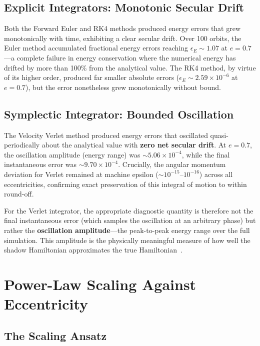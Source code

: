 \documentclass[twocolumn, 10pt]{article}
\begin{document}
\subsection{Explicit Integrators: Monotonic Secular Drift}

Both the Forward Euler and RK4 methods produced energy errors that grew monotonically with time, exhibiting a clear secular drift. Over 100 orbits, the Euler method accumulated fractional energy errors reaching $\epsilon_E \sim 1.07$ at $e = 0.7$---a complete failure in energy conservation where the numerical energy has drifted by more than 100\% from the analytical value. The RK4 method, by virtue of its higher order, produced far smaller absolute errors ($\epsilon_E \sim 2.59 \times 10^{-6}$ at $e = 0.7$), but the error nonetheless grew monotonically without bound.

\subsection{Symplectic Integrator: Bounded Oscillation}

The Velocity Verlet method produced energy errors that oscillated quasi-periodically about the analytical value with \textbf{zero net secular drift}. At $e = 0.7$, the oscillation amplitude (energy range) was $\sim 5.06 \times 10^{-4}$, while the final instantaneous error was $\sim 9.70 \times 10^{-4}$. Crucially, the angular momentum deviation for Verlet remained at machine epsilon ($\sim 10^{-15}$--$10^{-16}$) across all eccentricities, confirming exact preservation of this integral of motion to within round-off.

For the Verlet integrator, the appropriate diagnostic quantity is therefore not the final instantaneous error (which samples the oscillation at an arbitrary phase) but rather the \textbf{oscillation amplitude}---the peak-to-peak energy range over the full simulation. This amplitude is the physically meaningful measure of how well the shadow Hamiltonian approximates the true Hamiltonian~\cite{rein2019}.

\section{Power-Law Scaling Against Eccentricity}

\subsection{The Scaling Ansatz}
\end{document}
